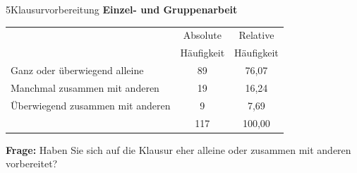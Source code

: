 \documentclass[xcolor=table,9pt,aspectratio=169]{beamer}
\begin{document}
\begin{frame}{\vspace*{10mm}5\hspace*{1em}Klausurvorbereitung}
\textbf{Einzel- und Gruppenarbeit}\\

\medskip
\begin{tabular}{lcc}
   \arrayrulecolor{blue2}\hline
                                      & Absolute     & Relative     \\
                                      & Häufigkeit   & Häufigkeit   \\
   \hline\hline
   Ganz oder überwiegend alleine      &  89          &  76,07       \\
   Manchmal zusammen mit anderen      &  19          &  16,24       \\
   Überwiegend zusammen mit anderen   &   9          &   7,69       \\
   \hline
                                      & 117          & 100,00       \\
   \hline
\end{tabular}

\bigskip
\textbf{Frage:} Haben Sie sich auf die Klausur eher alleine oder zusammen mit anderen vorbereitet?
\end{frame}
\end{document}
